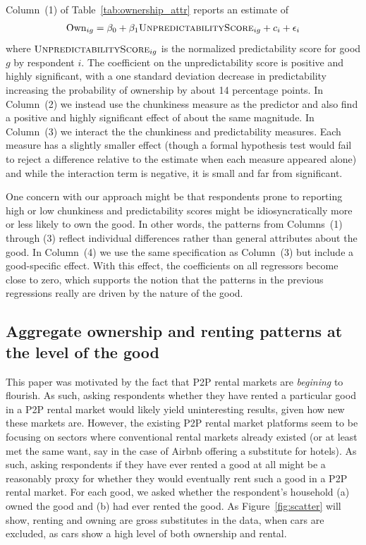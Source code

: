 \documentclass[11pt]{article}
\begin{document}
Column~(1) of Table~\ref{tab:ownership_attr} reports an estimate of 
\begin{align}
  \text{Own}_{ig} = \beta_0 + \beta_1 \textsc{UnpredictabilityScore}_{ig} + c_i + \epsilon_i
\end{align} 
where $\textsc{UnpredictabilityScore}_{ig}$ is the normalized predictability score for good $g$ by respondent $i$.
The coefficient on the unpredictability score is positive and highly significant, with a one standard deviation decrease in predictability increasing the probability of ownership by about 14 percentage points. 
In Column~(2) we instead use the chunkiness measure as the predictor and also find a positive and highly significant effect of about the same magnitude. 
In Column~(3) we interact the the chunkiness and predictability measures.
Each measure has a slightly smaller effect (though a formal hypothesis test would fail to reject a difference relative to the estimate when each measure appeared alone) and while the interaction term is negative, it is small and far from significant.

One concern with our approach might be that respondents prone to reporting high or low chunkiness and predictability scores might be idiosyncratically more or less likely to own the good.
In other words, the patterns from Columns~(1) through (3) reflect individual differences rather than general attributes about the good.
In Column~(4) we use the same specification as Column~(3) but include a good-specific effect.
With this effect, the coefficients on all regressors become close to zero, which supports the notion that the patterns in the previous regressions really are driven by the nature of the good. 

\subsection{Aggregate ownership and renting patterns at the level of the good}

This paper was motivated by the fact that P2P rental markets are \emph{begining} to flourish.
As such, asking respondents whether they have rented a particular good in a P2P rental market would likely yield uninteresting results, given how new these markets are.
However, the existing P2P rental market platforms seem to be focusing on sectors where conventional rental markets already existed (or at least met the same want, say in the case of Airbnb offering a substitute for hotels).
As such, asking respondents if they have ever rented a good at all might be a reasonably proxy for whether they would eventually rent such a good in a P2P rental market. 
For each good, we asked whether the respondent's household (a) owned the good and (b) had ever rented the good.
As Figure~\ref{fig:scatter} will show, renting and owning are gross substitutes in the data, when cars are excluded, as cars show a high level of both ownership and rental. 
\end{document}
